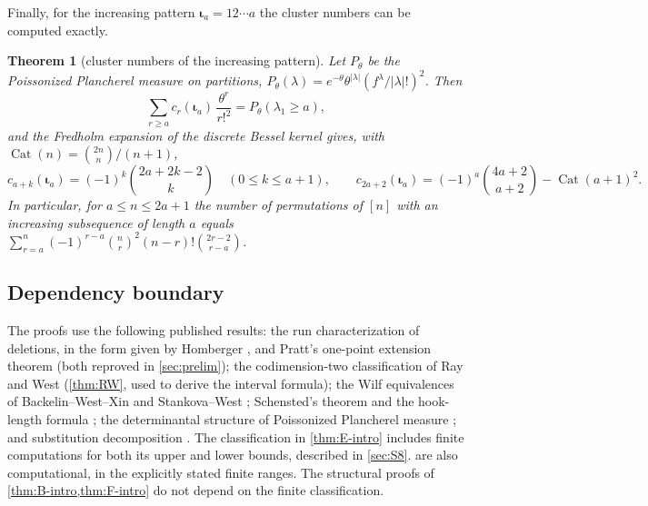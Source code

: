 \documentclass[11pt,reqno]{amsart}
\theoremstyle{plain}
\newtheorem{theorem}{Theorem}[section]
\theoremstyle{definition}
\theoremstyle{remark}
\newcommand{\Cat}{\operatorname{Cat}}
\let\greekiota\iota
\renewcommand{\iota}{\boldsymbol{\greekiota}}
\begin{document}
Finally, for the increasing pattern $\iota_a=12\cdots a$ the cluster numbers can be computed exactly.

\begin{theorem}[cluster numbers of the increasing pattern]\label{thm:D-intro}
Let $P_\theta$ be the Poissonized Plancherel measure on partitions, $P_\theta(\lambda)=e^{-\theta}\theta^{|\lambda|}(f^\lambda/|\lambda|!)^2$. Then
\begin{equation}\label{eq:plancherel-intro}
\sum_{r\ge a}c_r(\iota_a)\,\frac{\theta^r}{r!^2}=P_\theta(\lambda_1\ge a),
\end{equation}
and the Fredholm expansion of the discrete Bessel kernel gives, with $\Cat(n)=\binom{2n}{n}/(n+1)$,
\[
c_{a+k}(\iota_a)=(-1)^k\binom{2a+2k-2}{k}\quad(0\le k\le a+1),\qquad
c_{2a+2}(\iota_a)=(-1)^a\binom{4a+2}{a+2}-\Cat(a+1)^2 .
\]
In particular, for $a\le n\le 2a+1$ the number of permutations of $[n]$ with an increasing subsequence of length $a$ equals $\sum_{r=a}^{n}(-1)^{r-a}\binom nr^2(n-r)!\binom{2r-2}{r-a}$.
\end{theorem}

\subsection{Dependency boundary}\label{sec:boundary}

The proofs use the following published results: the run characterization
of deletions, in the form given by Homberger \cite[preprint, Lem.~5]{Homberger2012},
and Pratt's one-point extension theorem \cite{Pratt1973} (both reproved in
\cref{sec:prelim}); the codimension-two classification of Ray and West
\cite{RayWest2003} (\cref{thm:RW}, used to derive the interval formula);
the Wilf equivalences of Backelin--West--Xin \cite{BWX2007} and
Stankova--West \cite{StankovaWest2002}; Schensted's theorem
\cite{Schensted1961} and the hook-length formula \cite{FRT1954};
the determinantal structure of Poissonized Plancherel measure
\cite{BOO2000,Johansson2001}; and substitution decomposition
\cite{BHV2008}. The classification in \cref{thm:E-intro} includes finite
computations for both its upper and lower bounds, described in \cref{sec:S8}.
 are also computational, in the explicitly stated
finite ranges. The structural proofs of \cref{thm:B-intro,thm:F-intro}
do not depend on the finite classification.
\end{document}

